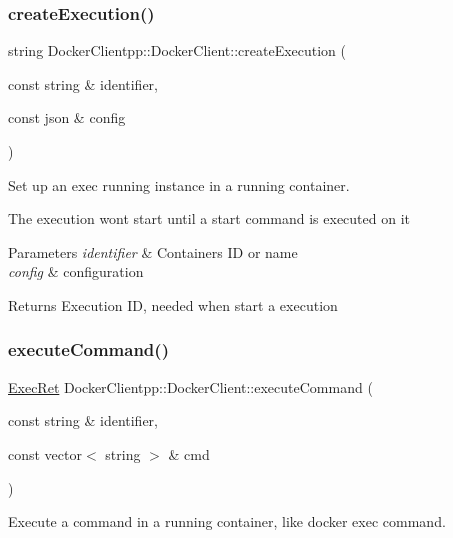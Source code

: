 \subsubsection{\texorpdfstring{createExecution()}{createExecution()}}
{\footnotesize\ttfamily string Docker\+Clientpp\+::\+Docker\+Client\+::create\+Execution (\begin{DoxyParamCaption}\item[{const string \&}]{identifier,  }\item[{const json \&}]{config }\end{DoxyParamCaption})}



Set up an exec running instance in a running container. 

The execution won\textquotesingle{}t start until a start command is executed on it


\begin{DoxyParams}{Parameters}
{\em identifier} & Container\textquotesingle{}s ID or name \\
\hline
{\em config} & configuration \\
\hline
\end{DoxyParams}
\begin{DoxyReturn}{Returns}
Execution ID, needed when start a execution 
\end{DoxyReturn}
\mbox{\label{classDockerClientpp_1_1DockerClient_af7874a9609cfa0b4eccbbbfe0aeb793d}} 
\subsubsection{\texorpdfstring{executeCommand()}{executeCommand()}}
{\footnotesize\ttfamily \mbox{\hyperlink{structDockerClientpp_1_1ExecRet}{Exec\+Ret}} Docker\+Clientpp\+::\+Docker\+Client\+::execute\+Command (\begin{DoxyParamCaption}\item[{const string \&}]{identifier,  }\item[{const vector$<$ string $>$ \&}]{cmd }\end{DoxyParamCaption})}



Execute a command in a running container, like {\ttfamily docker exec} command. 

